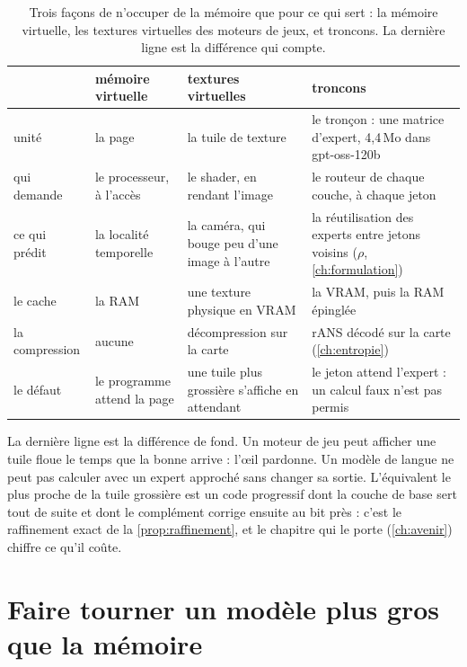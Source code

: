 \begin{table}[ht]
\centering\small
\caption[Trois façons de n'occuper que ce qui sert]{Trois façons de n'occuper de la mémoire que pour ce qui sert : la mémoire virtuelle, les textures virtuelles des moteurs de jeux, et troncons. La dernière ligne est la différence qui compte.}
\label{tab:analogie}
\begin{tabularx}{\linewidth}{@{}>{\raggedright}p{2.1cm}>{\raggedright}X>{\raggedright}X>{\raggedright\arraybackslash}X@{}}
\toprule
 & mémoire virtuelle & textures virtuelles & troncons \\
\midrule
unité & la page & la tuile de texture & le tronçon : une matrice d'expert, 4,4\,Mo dans gpt-oss-120b \\
qui demande & le processeur, à l'accès & le shader, en rendant l'image & le routeur de chaque couche, à chaque jeton \\
ce qui prédit & la localité temporelle & la caméra, qui bouge peu d'une image à l'autre & la réutilisation des experts entre jetons voisins ($\rho$, \cref{ch:formulation}) \\
le cache & la RAM & une texture physique en VRAM & la VRAM, puis la RAM épinglée \\
la compression & aucune & décompression sur la carte & rANS décodé sur la carte (\cref{ch:entropie}) \\
le défaut & le programme attend la page & une tuile plus grossière s'affiche en attendant & le jeton attend l'expert : un calcul faux n'est pas permis \\
\bottomrule
\end{tabularx}
\end{table}

La dernière ligne est la différence de fond. Un moteur de jeu peut afficher une tuile floue le temps que la bonne arrive : l'œil pardonne. Un modèle de langue ne peut pas calculer avec un expert approché sans changer sa sortie. L'équivalent le plus proche de la tuile grossière est un code progressif dont la couche de base sert tout de suite et dont le complément corrige ensuite au bit près : c'est le raffinement exact de la \cref{prop:raffinement}, et le chapitre qui le porte (\cref{ch:avenir}) chiffre ce qu'il coûte.

\section{Faire tourner un modèle plus gros que la mémoire}\label{sec:etat-dechargement}

